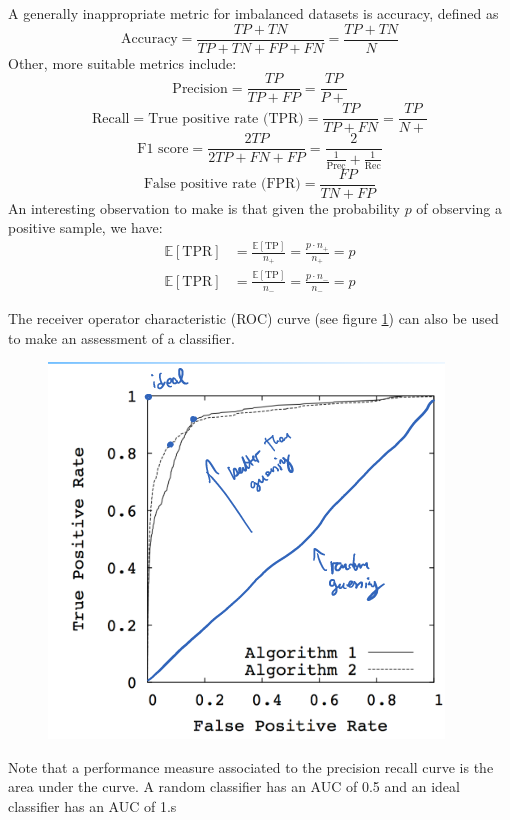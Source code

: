 \documentclass[a4paper,10pt,twoside]{article}
\begin{document}
A generally inappropriate metric for imbalanced datasets is accuracy, defined as
\begin{equation*}
    \text{Accuracy} = \frac{TP+TN}{TP+TN+FP+FN}=\frac{TP+TN}{N}
\end{equation*}
Other, more suitable metrics include:
\begin{equation*}
    \text{Precision}=\frac{TP}{TP+FP}=\frac{TP}{P+}
\end{equation*}
\begin{equation*}
    \text{Recall}=\text{True positive rate (TPR)}=\frac{TP}{TP+FN}=\frac{TP}{N+}
\end{equation*}
\begin{equation*}
    \text{F1 score}=\frac{2TP}{2TP+FN+FP}=\frac{2}{\frac{1}{\text{Prec}}+\frac{1}{\text{Rec}}}
\end{equation*}
\begin{equation*}
    \text{False positive rate (FPR)} = \frac{FP}{TN+FP}
\end{equation*}
An interesting observation to make is that given the probability $p$ of observing a positive sample, we have:
\begin{align*}
    \mathbb{E}[\text{TPR}]&=\frac{\mathbb{E}[\text{TP}]}{n_+}=\frac{p\cdot n_+}{n_+}=p\\
    \mathbb{E}[\text{TPR}]&=\frac{\mathbb{E}[\text{TP}]}{n_-}=\frac{p\cdot n_-}{n_-}=p
\end{align*}

The receiver operator characteristic (ROC) curve (see figure \ref{roc-curve}) can also be used to make an assessment of a classifier.

\begin{figure}
    \centering
    \includegraphics[width=.5\textwidth]{figures/roc_curve.png}
    \caption{}
    \label{roc-curve}
\end{figure}

Note that a performance measure associated to the precision recall curve is the area under the curve. A random classifier has an AUC of 0.5 and an ideal classifier has an AUC of 1.s
\end{document}
